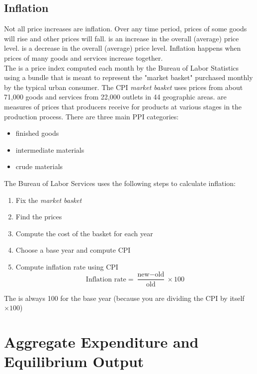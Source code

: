 \documentclass{article}
\begin{document}
\subsection{Inflation}

Not all price increases are inflation. Over any time period, prices of some goods will rise and other prices will fall.  is an increase in the overall (average) price level.  is a decrease in the overall (average) price level. Inflation happens when prices of many goods and services increase together. \\ 

The  is a price index computed each month by the Bureau of Labor Statistics using a bundle that is meant to represent the "market basket" purchased monthly by the typical urban consumer. The CPI \emph{market basket} uses prices from about 71,000 goods and services from 22,000 outlets in 44 geographic areas.  are measures of prices that producers receive for products at various stages in the production process. There are three main PPI categories:
\begin{itemize}
  \item finished goods 
  \item intermediate materials 
  \item crude materials
\end{itemize}

The Bureau of Labor Services uses the following steps to calculate inflation: 
\begin{enumerate}
  \item Fix the \emph{market basket} 
  \item Find the prices 
  \item Compute the cost of the basket for each year 
  \item Choose a base year and compute CPI 
  \item Compute inflation rate using CPI $$\textrm{Inflation rate} = \frac{\textrm{new} - \textrm{old}}{\textrm{old}} \times 100$$
\end{enumerate}

\begin{remark}
  The  is always 100 for the base year (because you are dividing the CPI by itself $\times 100$)
\end{remark}

\section{Aggregate Expenditure and Equilibrium Output}
\end{document}
